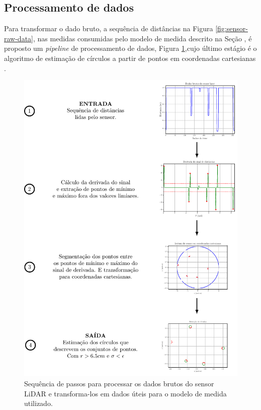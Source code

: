 \subsection{Processamento de dados}
Para transformar o dado bruto, a sequência de distâncias na Figura 
\ref{fig:sensor-raw-data}, nas medidas consumidas pelo modelo de medida 
descrito na Seção \emph{}, é proposto um 
\textit{pipeline} de processamento de dados, Figura \ref{fig:lidar-data-processing-pipeline},cujo último estágio é o 
algoritmo de estimação de círculos a partir de pontos em coordenadas 
cartesianas \cite[p.~903]{al2009error}.

\begin{figure}[h]
  \includegraphics[width=\textwidth]{figs/data_processing_pipeline.pdf}
  \caption{Sequência de passos para processar os dados brutos do sensor LiDAR e
  transforma-los em dados úteis para o modelo de medida utilizado.}
  \label{fig:lidar-data-processing-pipeline}
\end{figure}

